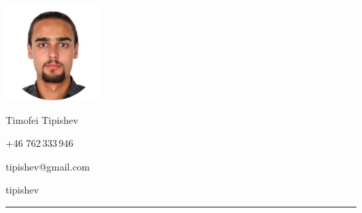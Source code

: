 \documentclass[a4paper,10pt]{article}
\newlength{\cvcolumngapwidth}
\newlength{\cvleftcolumnwidth}
\newlength{\cvrightcolumnwidth}
\newcommand{\cvnamestyle}[1]{{\Large\cvnamefont\textcolor{cvnamecolor}{#1}}}
\newcommand{\cvsectionstyle}[1]{{\normalsize\cvsectionfont\textcolor{cvsectioncolor}{#1}}}
\newlength{\cvafteritemskipamount}
\newlength{\cvaftersectionskipamount}
\newlength{\cvafternameskipamount}
\newlength{\cvafterpersonalinfolineskipamount}
\newcommand{\cvpersonalinfo}[2]{
    \begin{minipage}[t]{\cvleftcolumnwidth}
        \vspace{0mm} %
        \raggedleft #1
    \end{minipage}%
    \hspace{\cvcolumngapwidth}%
    \begin{minipage}[t]{\cvrightcolumnwidth}
        \vspace{0mm} %
        #2
    \end{minipage}

    \vspace{\cvafteritemskipamount}
}
\newcommand{\cvname}[1]{
    \cvnamestyle{#1}

    \vspace{\cvafternameskipamount}
}
\newcommand{\cvpersonalinfolinewithicon}[3]{
    \raisebox{.5\fontcharht\font`E-.5\height}{\texttt{[image: \#2]}}
    #3

    \vspace{\cvafterpersonalinfolineskipamount}
}
\newcommand{\cvsection}[1]{
    \begin{minipage}[t]{\cvleftcolumnwidth}
        \raggedleft\cvsectionstyle{#1}
    \end{minipage}%
    \hspace{\cvcolumngapwidth}%
    \begin{minipage}[t]{\cvrightcolumnwidth}
        \textcolor{cvrulecolor}{\rule{\cvrightcolumnwidth}{0.3mm}}
    \end{minipage}

    \vspace{\cvaftersectionskipamount}
}
\begin{document}

\cvpersonalinfo{
    \includegraphics[height=36mm]{me-circle.png}
}{
    \cvname{Timofei Tipishev}

    \cvpersonalinfolinewithicon{height=4mm}{067-phone.pdf}{
        +46 762\,333\,946
    }

    \cvpersonalinfolinewithicon{height=4mm}{070-envelop.pdf}{
        tipishev@gmail.com
    }

    \cvpersonalinfolinewithicon{height=4mm}{github.png}{
        tipishev
    }
}



\cvsection{WORK EXPERIENCE}
\end{document}
